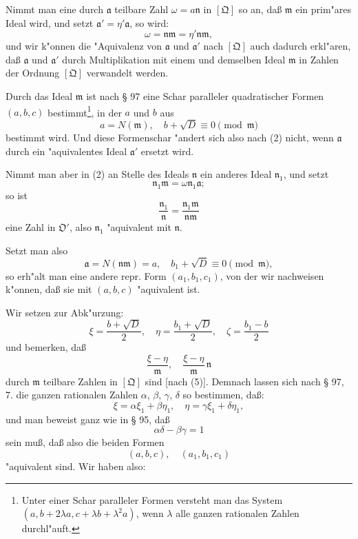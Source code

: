 \documentclass[12pt,a4paper]{article}
\theoremstyle{plain}
\begin{document}
Nimmt man eine durch $\mathfrak{a}$ teilbare Zahl $\omega = a\mathfrak{n}$ in $[\mathfrak{Q}]$ so an, da\ss{} $\mathfrak{m}$ ein prim"ares Ideal wird, und setzt $\mathfrak{a}' = \eta'\mathfrak{a}$, so wird:
\begin{equation}
\omega = \mathfrak{n}\mathfrak{m} = \eta'\mathfrak{n}\mathfrak{m},
\tag{2}
\end{equation}
und wir k"onnen die "Aquivalenz von $\mathfrak{a}$ und $\mathfrak{a}'$ nach $[\mathfrak{Q}]$ auch dadurch erkl"aren, da\ss{} $\mathfrak{a}$ und $\mathfrak{a}'$ durch Multiplikation mit einem und demselben Ideal $\mathfrak{m}$ in Zahlen der Ordnung $[\mathfrak{Q}]$ verwandelt werden.

Durch das Ideal $\mathfrak{m}$ ist nach \S{} 97 eine Schar paralleler quadratischer Formen $(a, b, c)$ bestimmt\footnote{Unter einer Schar paralleler Formen versteht man das System $(a, b + 2\lambda a, c + \lambda b + \lambda^2 a)$, wenn $\lambda$ alle ganzen rationalen Zahlen durchl"auft.}, in der $a$ und $b$ aus
\begin{equation}
a = N(\mathfrak{m}),\quad b + \sqrt{D} \equiv 0 \pmod{\mathfrak{m}}
\tag{3}
\end{equation}
bestimmt wird. Und diese Formenschar "andert sich also nach (2) nicht, wenn $\mathfrak{a}$ durch ein "aquivalentes Ideal $\mathfrak{a}'$ ersetzt wird.

Nimmt man aber in (2) an Stelle des Ideals $\mathfrak{n}$ ein anderes Ideal $\mathfrak{n}_1$, und setzt
\begin{equation}
\mathfrak{n}_1\mathfrak{m} = \omega\mathfrak{n}_1\mathfrak{a};
\tag{4}
\end{equation}
so ist
\[
\frac{\mathfrak{n}_1}{\mathfrak{n}} = \frac{\mathfrak{n}_1\mathfrak{m}}{\mathfrak{n}\mathfrak{m}}
\]
eine Zahl in $\mathfrak{O}'$, also $\mathfrak{n}_1$ "aquivalent mit $\mathfrak{n}$.

Setzt man also
\begin{equation}
\mathfrak{a} = N(\mathfrak{n}\mathfrak{m}) = a,\quad b_1 + \sqrt{D} \equiv 0 \pmod{\mathfrak{m}},
\tag{5}
\end{equation}
so erh"alt man eine andere repr. Form $(a_1, b_1, c_1)$, von der wir nachweisen k"onnen, da\ss{} sie mit $(a, b, c)$ "aquivalent ist.

Wir setzen zur Abk"urzung:
\[
\xi = \frac{b + \sqrt{D}}{2},\quad \eta = \frac{b_1 + \sqrt{D}}{2},\quad \zeta = \frac{b_1 - b}{2}
\]
und bemerken, da\ss{}
\[
\frac{\xi - \eta}{\mathfrak{m}},\quad \frac{\xi - \eta}{\mathfrak{m}}\,\mathfrak{n}
\]
durch $\mathfrak{m}$ teilbare Zahlen in $[\mathfrak{Q}]$ sind [nach (5)]. Demnach lassen sich nach \S{} 97, 7. die ganzen rationalen Zahlen $\alpha$, $\beta$, $\gamma$, $\delta$ so bestimmen, da\ss{}:
\begin{equation}
\xi = \alpha\xi_1 + \beta\eta_1,\quad \eta = \gamma\xi_1 + \delta\eta_1,
\tag{6}
\end{equation}
und man beweist ganz wie in \S{} 95, da\ss{}
\[
\alpha\delta - \beta\gamma = 1
\]
sein mu\ss{}, da\ss{} also die beiden Formen
\[
(a, b, c),\quad (a_1, b_1, c_1)
\]
"aquivalent sind. Wir haben also:
\end{document}
